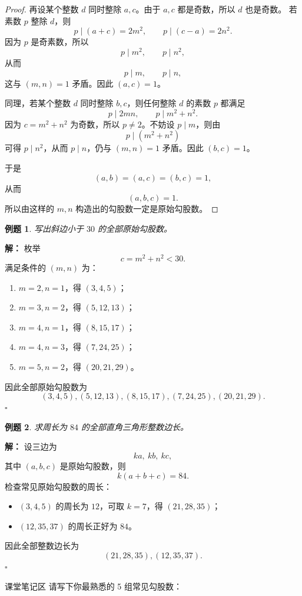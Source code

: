 \documentclass[11pt,a4paper,fontset=fandol]{ctexart}
\theoremstyle{formaltheorem}
\theoremstyle{formalexample}
\newtheorem{example}{例题}[section]
\newenvironment{solution}{\par\noindent\textbf{解：}}{\hfill$\square$\par}
\newcommand{\classblank}{\vspace{2.2cm}}
\begin{document}
\begin{proof}
再设某个整数 $d$ 同时整除 $a,c$。由于 $a,c$ 都是奇数，所以 $d$ 也是奇数。
若素数 $p$ 整除 $d$，则
\[
p\mid (a+c)=2m^2,\qquad p\mid (c-a)=2n^2.
\]
因为 $p$ 是奇素数，所以
\[
p\mid m^2,\qquad p\mid n^2,
\]
从而
\[
p\mid m,\qquad p\mid n,
\]
这与 $(m,n)=1$ 矛盾。因此 $(a,c)=1$。

同理，若某个整数 $d$ 同时整除 $b,c$，则任何整除 $d$ 的素数 $p$ 都满足
\[
p\mid 2mn,\qquad p\mid m^2+n^2.
\]
因为 $c=m^2+n^2$ 为奇数，所以 $p\ne 2$。不妨设 $p\mid m$，则由
\[
p\mid (m^2+n^2)
\]
可得 $p\mid n^2$，从而 $p\mid n$，仍与 $(m,n)=1$ 矛盾。因此 $(b,c)=1$。

于是
\[
(a,b)=(a,c)=(b,c)=1,
\]
从而
\[
(a,b,c)=1.
\]
所以由这样的 $m,n$ 构造出的勾股数一定是原始勾股数。
\end{proof}

\begin{example}
写出斜边小于 $30$ 的全部原始勾股数。
\end{example}

\begin{solution}
枚举
\[
c=m^2+n^2<30.
\]
满足条件的 $(m,n)$ 为：
\begin{enumerate}
  \item $m=2,n=1$，得 $(3,4,5)$；
  \item $m=3,n=2$，得 $(5,12,13)$；
  \item $m=4,n=1$，得 $(8,15,17)$；
  \item $m=4,n=3$，得 $(7,24,25)$；
  \item $m=5,n=2$，得 $(20,21,29)$。
\end{enumerate}
因此全部原始勾股数为
\[
\boxed{(3,4,5),(5,12,13),(8,15,17),(7,24,25),(20,21,29)}.
\]
\end{solution}

\begin{example}
求周长为 $84$ 的全部直角三角形整数边长。
\end{example}

\begin{solution}
设三边为
\[
ka,\ kb,\ kc,
\]
其中 $(a,b,c)$ 是原始勾股数，则
\[
k(a+b+c)=84.
\]
检查常见原始勾股数的周长：
\begin{itemize}
  \item $(3,4,5)$ 的周长为 $12$，可取 $k=7$，得 $(21,28,35)$；
  \item $(12,35,37)$ 的周长正好为 $84$。
\end{itemize}
因此全部整数边长为
\[
\boxed{(21,28,35),(12,35,37)}.
\]
\end{solution}

\begin{notebox}{课堂笔记区}
请写下你最熟悉的 5 组常见勾股数：
\classblank
\end{notebox}
\end{document}
